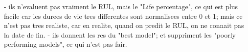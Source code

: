 - ils n'evaluent pas vraiment le RUL, mais le "Life percentage", ce qui est plus facile car les durees de vie tres differentes sont
  normalisees entre 0 et 1; mais ce n'est pas tres realiste, car en realite, quand on predit le RUL, on ne connait pas la date de fin.
- ils donnent les res du "best model"; et suppriment les "poorly performing models", ce qui n'est pas fair.

